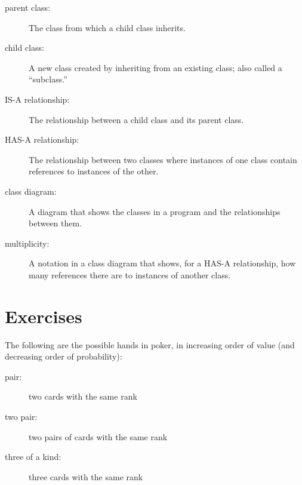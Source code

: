 \documentclass[10pt]{book}
\begin{document}
\begin{CJK}{UTF8}{gbsn}
\begin{description}
\item[parent class:] The class from which a child class inherits.

\item[child class:] A new class created by inheriting from an
existing class; also called a ``subclass.''

\item[IS-A relationship:] The relationship between a child class
and its parent class.

\item[HAS-A relationship:] The relationship between two classes
where instances of one class contain references to instances of
the other.

\item[class diagram:] A diagram that shows the classes in a program
and the relationships between them.

\item[multiplicity:] A notation in a class diagram that shows, for
a HAS-A relationship, how many references there are to instances
of another class.

\end{description}


\section{Exercises}

\begin{exercise}
\label{poker}

The following are the possible hands in poker, in increasing order
of value (and decreasing order of probability):

\begin{description}

\item[pair:] two cards with the same rank
\vspace{-0.05in}

\item[two pair:] two pairs of cards with the same rank
\vspace{-0.05in}

\item[three of a kind:] three cards with the same rank
\vspace{-0.05in}


\end{description}
\end{exercise}
\end{CJK}
\end{document}
